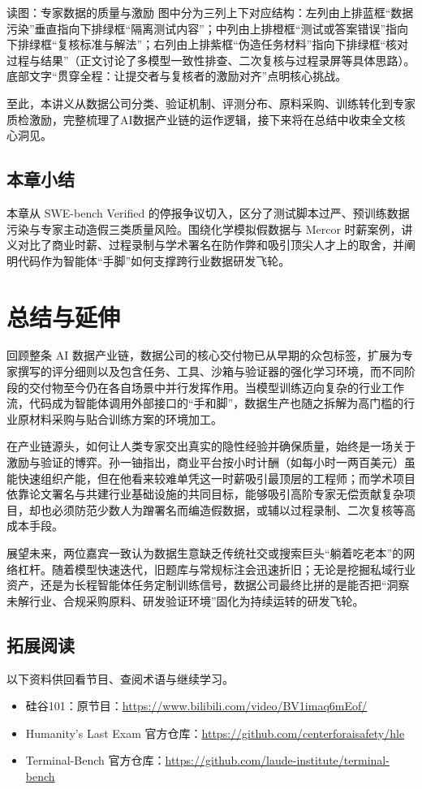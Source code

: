 \documentclass[UTF8,a4paper,11pt,fontset=fandol]{ctexart}
\begin{document}
\begin{knowledgebox}{读图：专家数据的质量与激励}
图中分为三列上下对应结构：左列由上排蓝框“数据污染”垂直指向下排绿框“隔离测试内容”；中列由上排橙框“测试或答案错误”指向下排绿框“复核标准与解法”；右列由上排紫框“伪造任务材料”指向下排绿框“核对过程与结果”（正文讨论了多模型一致性排查、二次复核与过程录屏等具体思路）。底部文字“贯穿全程：让提交者与复核者的激励对齐”点明核心挑战。
\end{knowledgebox}
至此，本讲义从数据公司分类、验证机制、评测分布、原料采购、训练转化到专家质检激励，完整梳理了AI数据产业链的运作逻辑，接下来将在总结中收束全文核心洞见。
\subsection{本章小结}
本章从 SWE-bench Verified 的停报争议切入，区分了测试脚本过严、预训练数据污染与专家主动造假三类质量风险。围绕化学模拟假数据与 Mercor 时薪案例，讲义对比了商业时薪、过程录制与学术署名在防作弊和吸引顶尖人才上的取舍，并阐明代码作为智能体“手脚”如何支撑跨行业数据研发飞轮。
\section{总结与延伸}
回顾整条 AI 数据产业链，数据公司的核心交付物已从早期的众包标签，扩展为专家撰写的评分细则以及包含任务、工具、沙箱与验证器的强化学习环境，而不同阶段的交付物至今仍在各自场景中并行发挥作用。当模型训练迈向复杂的行业工作流，代码成为智能体调用外部接口的“手和脚”，数据生产也随之拆解为高门槛的行业原材料采购与贴合训练方案的环境加工。

在产业链源头，如何让人类专家交出真实的隐性经验并确保质量，始终是一场关于激励与验证的博弈。孙一铀指出，商业平台按小时计酬（如每小时一两百美元）虽能快速组织产能，但在他看来较难单凭这一时薪吸引最顶层的工程师；而学术项目依靠论文署名与共建行业基础设施的共同目标，能够吸引高阶专家无偿贡献复杂项目，却也必须防范少数人为蹭署名而编造假数据，或辅以过程录制、二次复核等高成本手段。

展望未来，两位嘉宾一致认为数据生意缺乏传统社交或搜索巨头“躺着吃老本”的网络杠杆。随着模型快速迭代，旧题库与常规标注会迅速折旧；无论是挖掘私域行业资产，还是为长程智能体任务定制训练信号，数据公司最终比拼的是能否把“洞察未解行业、合规采购原料、研发验证环境”固化为持续运转的研发飞轮。
\subsection{拓展阅读}
以下资料供回看节目、查阅术语与继续学习。
\begin{itemize}
\item 硅谷101：原节目：\url{https://www.bilibili.com/video/BV1imaq6mEof/}
\item Humanity's Last Exam 官方仓库：\url{https://github.com/centerforaisafety/hle}
\item Terminal-Bench 官方仓库：\url{https://github.com/laude-institute/terminal-bench}
\end{itemize}
\end{document}
